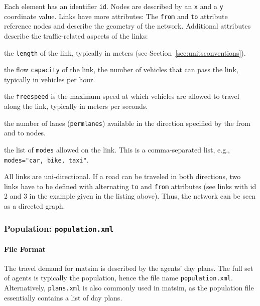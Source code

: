 Each element has an identifier \lstinline|id|. Nodes are described by an \lstinline|x| and a \lstinline|y| coordinate value. Links have more attributes: The \lstinline|from| and \lstinline|to| attribute reference nodes and describe the geometry of the network. Additional attributes describe the traffic-related aspects of the links:
\begin{compactitem}
    \item the \lstinline|length| of the link, typically in meters (see Section~\ref{sec:unitsconventions}).
    \item the flow \lstinline|capacity| of the link, \ie the number of vehicles that can pass the link, typically in vehicles per hour.
    \item the \lstinline|freespeed| is the maximum speed at which vehicles are allowed to travel along the link, typically in meters per seconds.
    \item the number of lanes (\lstinline|permlanes|) available in the direction specified by the from and to nodes.
    \item the list of \lstinline|modes| allowed on the link. This is a comma-separated list, e.g.,\,\lstinline|modes="car, bike, taxi"|.
\end{compactitem}
All links are uni-directional. If a road can be traveled in both directions, two links have to be defined with alternating \lstinline|to| and \lstinline|from| attributes (see links with id 2 and 3 in the example given in the listing above). Thus, the network can be seen as a directed graph. 

\subsubsection{Population: \lstinline|population.xml|}
\label{sec:lgstarted-population}
\paragraph{File Format}

The travel demand for \gls{matsim} is described by the agents' day plans. The full set of agents is typically the population, hence the file name \lstinline|population.xml|. Alternatively, \lstinline|plans.xml| is also commonly used in \gls{matsim}, as the population file essentially contains a list of day plans.

